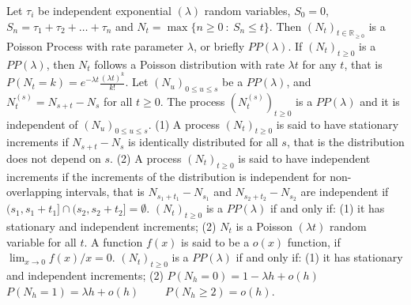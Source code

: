  Let $\tau_i$ be independent exponential $(\lambda)$ random variables, $S_0 = 0$, $S_n = \tau_1 + \tau_2 + \ldots + \tau_n$ and $N_t = \max\{n \ge 0\ :\ S_n \le t\}$. Then $(N_t)_{t \in \mathbb{R}_{\ge 0}}$ is a Poisson Process with rate parameter $\lambda$, or briefly $PP(\lambda)$.
 If $(N_t)_{t \ge 0}$ is a $PP(\lambda)$, then $N_t$ follows a Poisson distribution with rate $\lambda t$ for any $t$, that is $P(N_t = k) = e^{-\lambda t}\frac{(\lambda t)^k}{k!}$.
 Let $(N_u)_{0 \le u \le s}$ be a  $PP(\lambda)$, and $N^{(s)}_t = N_{s+t}-N_s$ for all $t \ge 0$. The process $(N^{(s)}_t)_{t \ge 0}$ is a $PP(\lambda)$ and it is independent of $(N_u)_{0 \le u \le s}$.
(1) A process $(N_t)_{t \ge 0}$  is said to have stationary increments if $N_{s+t} - N_s$ is identically distributed for all $s$, that is the distribution does not depend on $s$.
(2) A process $(N_t)_{t \ge 0}$ is said to have independent increments if the increments of the distribution is independent for non-overlapping intervals, that is $N_{s_1 + t_1} - N_{s_1}$ and $N_{s_2 + t_2} -N_{s_2}$ are independent if $(s_1,s_1 + t_1] \cap (s_2,s_2 + t_2] = \emptyset$.
 $(N_t)_{t \ge 0}$ is a $PP(\lambda)$ if and only if: 
(1) it has stationary and independent increments; 
(2) $N_t$ is a Poisson $(\lambda t)$ random variable for all $t$.
 A function $f(x)$ is said to be a $o(x)$ function, if $\lim_{x \to 0} f(x)/x = 0$.
 $(N_t)_{t \ge 0}$ is a $PP(\lambda)$ if and only if: 
(1) it has stationary and independent increments;
(2) $P(N_h = 0) = 1 -\lambda h +o(h) \qquad$ 
$P(N_h = 1) = \lambda h + o(h) \qquad$ 
$P(N_h \ge 2) = o(h)$.